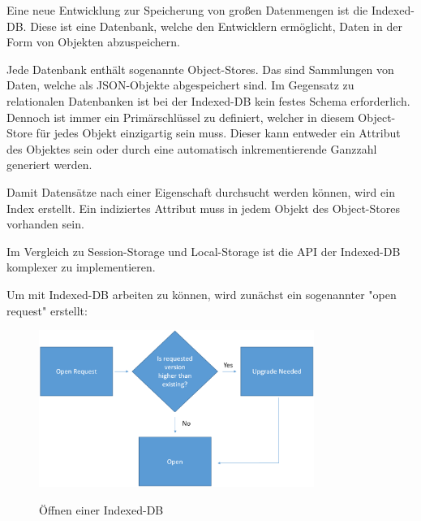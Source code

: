 \label{sec:indexeddb}

Eine neue Entwicklung zur Speicherung von großen Datenmengen ist die Indexed-DB. 
Diese ist eine Datenbank, welche den Entwicklern ermöglicht, Daten in der Form von Objekten abzuspeichern.

Jede Datenbank enthält sogenannte Object-Stores. Das sind Sammlungen von Daten, welche als JSON-Objekte abgespeichert sind. 
Im Gegensatz zu relationalen Datenbanken ist bei der Indexed-DB kein festes Schema erforderlich. 
Dennoch ist immer ein Primärschlüssel zu definiert, welcher in diesem Object-Store für jedes Objekt einzigartig sein muss.
Dieser kann entweder ein Attribut des Objektes sein oder durch eine automatisch inkrementierende Ganzzahl generiert werden. 

Damit Datensätze nach einer Eigenschaft durchsucht werden können, wird ein Index erstellt. 
Ein indiziertes Attribut muss in jedem Objekt des Object-Stores vorhanden sein.

Im Vergleich zu Session-Storage und Local-Storage ist die API der Indexed-DB komplexer zu implementieren.

Um mit Indexed-DB arbeiten zu können, wird zunächst ein sogenannter "open request" erstellt:


\begin{figure}[H]
    \centering
    \includegraphics[width=0.8\textwidth]{media/Webspeicher/openDb.png}
    \caption{Öffnen einer Indexed-DB}
    \cite{fig:openDB}
\end{figure}

